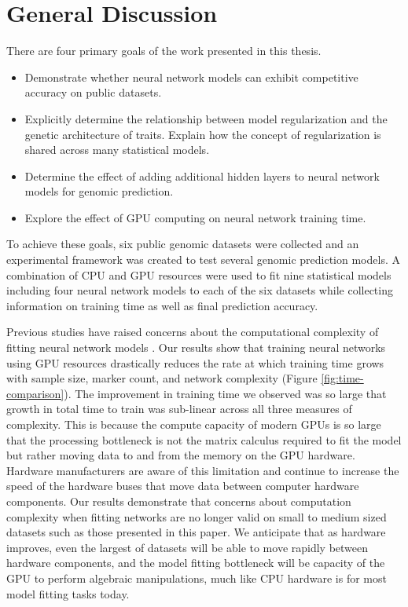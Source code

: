 \section{General Discussion}

There are four primary goals of the work presented in this thesis.

\begin{itemize}
    \item Demonstrate whether neural network models can exhibit competitive 
          accuracy on public datasets.
    \item Explicitly determine the relationship between model regularization and 
          the genetic architecture of traits. Explain how the concept of 
          regularization is shared across many statistical models.
    \item Determine the effect of adding additional hidden layers to neural 
          network models for genomic prediction.
    \item Explore the effect of GPU computing on neural network training time.
\end{itemize}

To achieve these goals, six public genomic datasets were collected and an
experimental framework was created to test several genomic prediction models.
A combination of CPU and GPU resources were
used to fit nine statistical models including four neural network models
to each of the six datasets while collecting information on training 
time as well as final prediction accuracy. 

Previous studies have raised concerns about the computational complexity of fitting
neural network models \citep{heslot2012,gonzalez-recio2014}. Our results show
that training neural networks using GPU resources drastically
reduces the rate at which training time grows with sample size, marker count,
and network complexity (Figure \ref{fig:time-comparison}). The improvement in 
training time we observed was so large that growth in total time to train was sub-linear
across all three measures of complexity. This is because the compute capacity 
of modern GPUs is so large that the processing bottleneck is not the matrix calculus
required to fit the model but rather moving data to and from the memory on 
the GPU hardware. Hardware manufacturers are aware of this limitation 
and continue to increase the speed of the hardware 
buses that move data between computer hardware components. Our results
demonstrate that concerns about computation complexity when fitting 
networks are no longer valid on small to medium sized datasets such as 
those presented in this paper. We anticipate that as hardware improves, 
even the largest of datasets will be able to move rapidly between hardware components, 
and the model fitting bottleneck will be capacity of the
GPU to perform algebraic manipulations, much like CPU hardware is for most 
model fitting tasks today.

